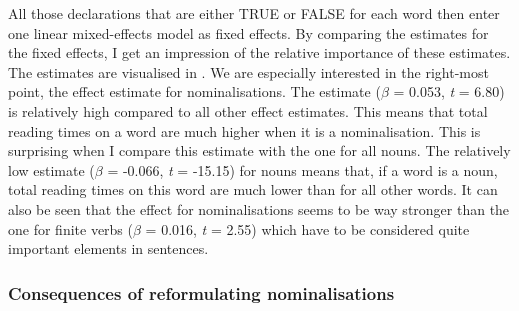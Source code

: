 \documentclass[output=paper]{langsci/langscibook}
\begin{document}
All those declarations that are either TRUE or FALSE for each word then enter one linear mixed-effects model as fixed effects. By comparing the estimates for the fixed effects, I get an impression of the relative importance of these estimates. The estimates are visualised in . We are especially interested in the right-most point, the effect estimate for nominalisations. The estimate (\textit{$\beta $} = 0.053, \textit{t} = 6.80) is relatively high compared to all other effect estimates. This means that total reading times on a word are much higher when it is a nominalisation. This is surprising when I compare this estimate with the one for all nouns. The relatively low estimate (\textit{$\beta $} = -0.066, \textit{t} = -15.15) for nouns means that, if a word is a noun, total reading times on this word are much lower than for all other words. It can also be seen that the effect for nominalisations seems to be way stronger than the one for finite verbs (\textit{$\beta $} = 0.016, \textit{t} = 2.55) which have to be considered quite important elements in sentences.

\subsubsection{Consequences of reformulating nominalisations}
\end{document}
